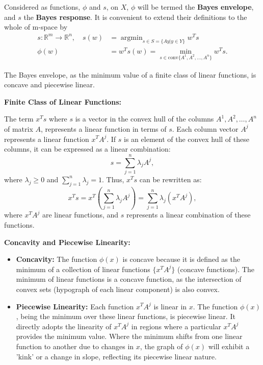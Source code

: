 \documentclass[11pt]{article}
\numberwithin{equation}{section}
\DeclareMathOperator*{\argmin}{argmin}
\theoremstyle{boldStyle}
\begin{document}
Considered as functions, $\phi$ and $s$, on $X$, $\phi$ will be termed the \textbf{Bayes envelope}, and $s$ the \textbf{Bayes response}.
It is convenient to extend their definitions to the whole of m-space by 
\begin{equation} \label{eq:2.9}
    \begin{aligned}
        s : \mathbb{R}^m \rightarrow \mathbb{R}^n, \quad s(w) &= \argmin_{s \in S = \{Ay | y \in Y \}} w^T s \\
        \phi(w) &=  w^T s(w) = \min_{s \in \text{conv}\{A^1, A^2, \ldots, A^n\}} w^T s.
    \end{aligned}
\end{equation}


\begin{bluebox}
    The Bayes envelope, as the minimum value of a finite class of linear functions, is concave and piecewise linear.
\end{bluebox}

\textbf{Finite Class of Linear Functions:}

The term \(x^T s\) where \(s\) is a vector in the convex hull of the columns \(A^1, A^2, \ldots, A^n\) of matrix \(A\), represents a linear function in terms of \(s\). Each column vector \(A^j\) represents a linear function \(x^T A^j\). If \(s\) is an element of the convex hull of these columns, it can be expressed as a linear combination:
\[
s = \sum_{j=1}^n \lambda_j A^j,
\]
where \(\lambda_j \geq 0\) and \(\sum_{j=1}^n \lambda_j = 1\). Thus, \(x^T s\) can be rewritten as:
\[
x^T s = x^T \left(\sum_{j=1}^n \lambda_j A^j\right) = \sum_{j=1}^n \lambda_j (x^T A^j),
\]
where \(x^T A^j\) are linear functions, and \(s\) represents a linear combination of these functions.

\textbf{Concavity and Piecewise Linearity:}

\begin{itemize}
    \item \textbf{Concavity:} The function \(\phi(x)\) is concave because it is defined as the minimum of a collection of 
        linear functions \(\{x^T A^j\}\) (concave functions).
        The minimum of linear functions is a concave function, as the intersection of convex sets (hypograph of each linear component) is also convex.

    \item \textbf{Piecewise Linearity:} Each function \(x^T A^j\) is linear in \(x\). 
        The function \(\phi(x)\), being the minimum over these linear functions, is piecewise linear. 
        It directly adopts the linearity of \(x^T A^j\) in regions where a particular \(x^T A^j\) provides the minimum value. 
        Where the minimum shifts from one linear function to another due to changes in \(x\), the graph of \(\phi(x)\) will exhibit 
        a 'kink' or a change in slope, reflecting its piecewise linear nature.
\end{itemize}
\end{document}
